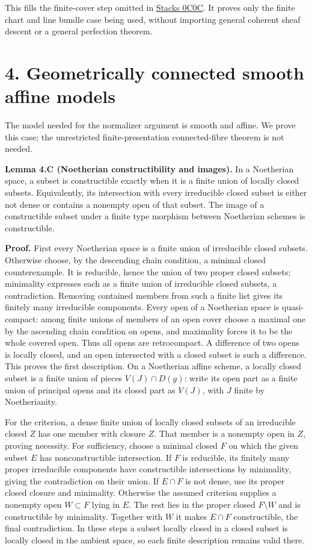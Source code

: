 \documentclass[11pt,a4paper,openany]{report}
\newcounter{none}
\begin{document}
This fills the finite-cover step omitted in \href{https://stacks.math.columbia.edu/tag/0C0C}{Stacks 0C0C}. It proves only the finite chart and line bundle case being used, without importing general coherent sheaf descent or a general perfection theorem.

\section{4. Geometrically connected smooth affine models}\label{AG-RG-S02-geometrically-connected-smooth-affine-models}

The model needed for the normalizer argument is smooth and affine. We prove this case; the unrestricted finite-presentation connected-fibre theorem is not needed.

\textbf{Lemma 4.C (Noetherian constructibility and images).} In a Noetherian space, a subset is constructible exactly when it is a finite union of locally closed subsets. Equivalently, its intersection with every irreducible closed subset is either not dense or contains a nonempty open of that subset. The image of a constructible subset under a finite type morphism between Noetherian schemes is constructible.

\textbf{Proof.} First every Noetherian space is a finite union of irreducible closed subsets. Otherwise choose, by the descending chain condition, a minimal closed counterexample. It is reducible, hence the union of two proper closed subsets; minimality expresses each as a finite union of irreducible closed subsets, a contradiction. Removing contained members from such a finite list gives its finitely many irreducible components. Every open of a Noetherian space is quasi-compact: among finite unions of members of an open cover choose a maximal one by the ascending chain condition on opens, and maximality forces it to be the whole covered open. Thus all opens are retrocompact. A difference of two opens is locally closed, and an open intersected with a closed subset is such a difference. This proves the first description. On a Noetherian affine scheme, a locally closed subset is a finite union of pieces \(V(J)\cap D(g)\): write its open part as a finite union of principal opens and its closed part as \(V(J)\), with \(J\) finite by Noetherianity.

For the criterion, a dense finite union of locally closed subsets of an irreducible closed \(Z\) has one member with closure \(Z\). That member is a nonempty open in \(Z\), proving necessity. For sufficiency, choose a minimal closed \(F\) on which the given subset \(E\) has nonconstructible intersection. If \(F\) is reducible, its finitely many proper irreducible components have constructible intersections by minimality, giving the contradiction on their union. If \(E\cap F\) is not dense, use its proper closed closure and minimality. Otherwise the assumed criterion supplies a nonempty open \(W\subset F\) lying in \(E\). The rest lies in the proper closed \(F\setminus W\) and is constructible by minimality. Together with \(W\) it makes \(E\cap F\) constructible, the final contradiction. In these steps a subset locally closed in a closed subset is locally closed in the ambient space, so each finite description remains valid there.
\end{document}
